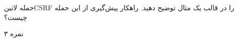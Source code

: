 \documentclass[../main.tex]{subfiles}
\begin{document}

حمله ‌لاتین{CSRF} را در قالب یک مثال توضیح دهید. راهکار پیش‌گیری از این حمله چیست؟

۳ نمره
\end{document}
